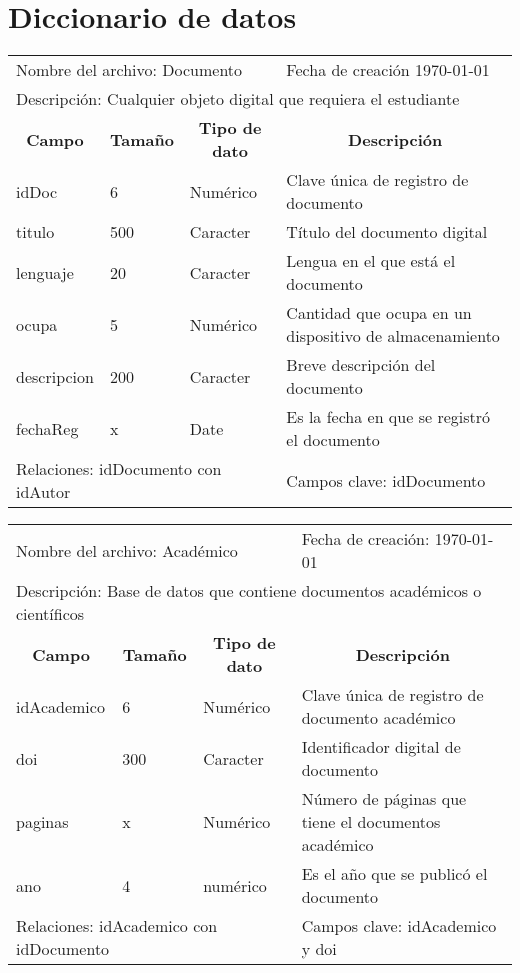 \chapter{Diccionario de datos}


\begin{table}[h]
\begin{tabular}{lllp{10cm}}
\multicolumn{3}{l}{Nombre del archivo: Documento} & \multicolumn{1}{l}{Fecha de creación \today}\\
\multicolumn{4}{l}{Descripción: Cualquier objeto digital que requiera el estudiante} \\ \hline
\multicolumn{1}{c}{\textbf{Campo}} & \multicolumn{1}{c}{\textbf{Tamaño}} & \multicolumn{1}{c}{\textbf{Tipo de dato}} & \multicolumn{1}{c}{\textbf{Descripción}} \\ \hline

idDoc   & 6   & Numérico    & Clave única de registro de documento  \\
titulo  & 500  & Caracter   & Título del documento digital \\
lenguaje & 20  & Caracter   & Lengua en el que está el documento \\
ocupa    & 5   & Numérico   & Cantidad que ocupa en un dispositivo de almacenamiento  \\
descripcion   & 200  & Caracter  & Breve descripción del documento  \\ 
fechaReg      & x    & Date      & Es la fecha en que se registró el documento         \\ 
\hline
\multicolumn{3}{l}{Relaciones: idDocumento con idAutor} & \multicolumn{1}{l}{Campos clave: idDocumento}          
\end{tabular}
\end{table}
\begin{table}[h]
\begin{tabular}{lllp{10cm}}
\multicolumn{3}{l}{Nombre del archivo: Académico} & \multicolumn{1}{l}{Fecha de creación: \today}\\
\multicolumn{4}{l}{Descripción: Base de datos que contiene documentos académicos o científicos} \\ \hline
\multicolumn{1}{c}{\textbf{Campo}} & \multicolumn{1}{c}{\textbf{Tamaño}} & \multicolumn{1}{c}{\textbf{Tipo de dato}} & \multicolumn{1}{c}{\textbf{Descripción}} \\ \hline

idAcademico   & 6   & Numérico    & Clave única de registro de documento académico  \\
doi  & 300  & Caracter   & Identificador digital de documento \\
paginas  & x  & Numérico   & Número de páginas que tiene el documentos académico \\
ano & 4  & numérico   & Es el año que se publicó el documento\\
\hline
\multicolumn{3}{l}{Relaciones: idAcademico con idDocumento} & \multicolumn{1}{l}{Campos clave: idAcademico y doi}          
\end{tabular}
\end{table}
